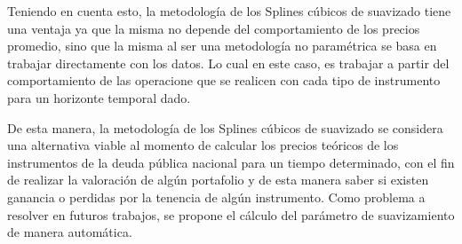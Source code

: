 \hspace{0.4cm} Teniendo en cuenta esto, la metodolog\'ia de los Splines c\'ubicos de suavizado tiene una ventaja ya que la misma no depende del comportamiento de los precios promedio, sino que la misma al ser una metodolog\'ia no param\'etrica se basa en trabajar directamente con los datos. Lo cual en este caso, es trabajar a partir del comportamiento de las operacione que se realicen con cada tipo de instrumento para un horizonte temporal dado.

\hspace{0.4cm} De esta manera, la metodolog\'ia de los Splines c\'ubicos de suavizado se considera una alternativa viable al momento de calcular los precios te\'oricos de los instrumentos de la deuda p\'ublica nacional para un tiempo determinado, con el fin de realizar la valoraci\'on de alg\'un portafolio y de esta manera saber si existen ganancia o perdidas por la tenencia de alg\'un instrumento. Como problema a resolver en futuros trabajos, se propone el c\'alculo del par\'ametro de suavizamiento de manera autom\'atica. 



